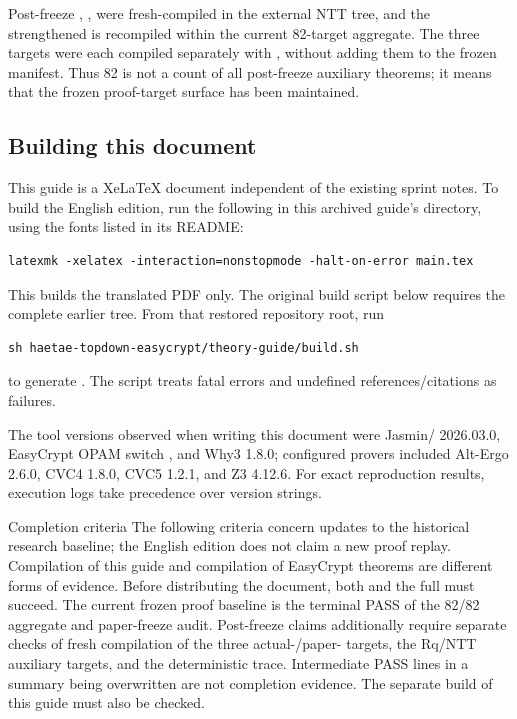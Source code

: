 \begin{boundary}
Post-freeze ,
,\newline
{} were fresh-compiled in the external NTT tree, and
the strengthened \newline{} is recompiled
within the current 82-target aggregate. The three
 targets were each compiled separately
with , without adding them to the frozen manifest. Thus 82 is
not a count of all post-freeze auxiliary theorems; it means that the frozen
proof-target surface has been maintained.
\end{boundary}

\subsection{Building this document}

This guide is a XeLaTeX document independent of the existing sprint notes.
To build the English edition, run the following in this archived guide's
directory, using the fonts listed in its README:
\begin{verbatim}
latexmk -xelatex -interaction=nonstopmode -halt-on-error main.tex
\end{verbatim}
This builds the translated PDF only. The original build script below requires
the complete earlier tree. From that restored repository root, run

\begin{verbatim}
sh haetae-topdown-easycrypt/theory-guide/build.sh
\end{verbatim}

to generate .
The script treats fatal errors and undefined references/citations as failures.

The tool versions observed when writing this document were
Jasmin/ 2026.03.0, EasyCrypt OPAM switch
, and Why3 1.8.0; configured provers included
Alt-Ergo 2.6.0, CVC4 1.8.0, CVC5 1.2.1, and Z3 4.12.6.
For exact reproduction results, execution logs take precedence over version strings.

\begin{takeaway}{Completion criteria}
The following criteria concern updates to the historical research baseline;
the English edition does not claim a new proof replay.
Compilation of this guide and compilation of EasyCrypt theorems are different
forms of evidence. Before distributing the document, both 
and the full  must succeed. The current frozen proof
baseline is the terminal PASS of the 82/82 aggregate and paper-freeze audit.
Post-freeze claims additionally require separate checks of fresh compilation of
the three actual-/paper- targets, the Rq/NTT
auxiliary targets, and the deterministic trace. Intermediate PASS lines in a
summary being overwritten are not completion evidence. The separate build of
this guide must also be checked.
\end{takeaway}
